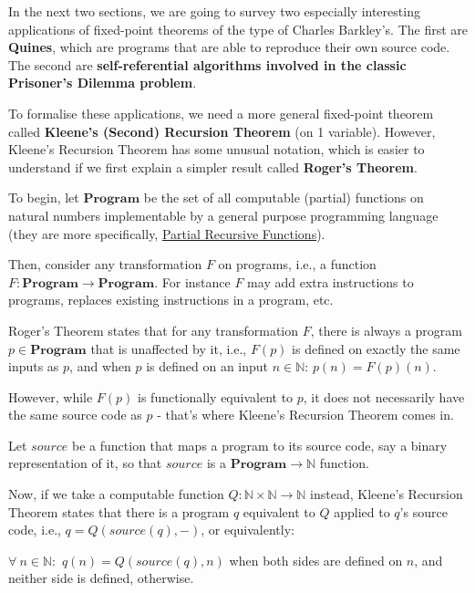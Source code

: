 In the next two sections, we are going to survey two especially interesting applications of fixed-point theorems of the type of Charles Barkley's. The first are \textbf{Quines}, which are programs that are able to reproduce their own source code. The second are \textbf{self-referential algorithms involved in the classic Prisoner's Dilemma problem}.

To formalise these applications, we need a more general fixed-point theorem called \textbf{Kleene's (Second) Recursion Theorem} (on 1 variable). However, Kleene's Recursion Theorem has some unusual notation, which is easier to understand if we first explain a simpler result called \textbf{Roger's Theorem}.

To begin, let $\textbf{Program}$ be the set of all computable (partial) functions on natural numbers implementable by a general purpose programming language (they are more specifically, \href{https://en.wikipedia.org/wiki/General_recursive_function}{Partial Recursive Functions}).

Then, consider any transformation $F$ on programs, i.e., a function $F: \textbf{Program} \rightarrow \textbf{Program}$. For instance $F$ may add extra instructions to programs, replaces existing instructions in a program, etc.

Roger's Theorem states that for any transformation $F$, there is always a program $p \in \textbf{Program}$ that is unaffected by it, i.e., $F(p)$ is defined on exactly the same inputs as $p$, and when $p$ is defined on an input $n \in \mathbb{N}$: $p(n) = F(p)(n)$.

However, while $F(p)$ is functionally equivalent to $p$, it does not necessarily have the same source code as $p$ - that's where Kleene's Recursion Theorem comes in.

Let $source$ be a function that maps a program to its source code, say a binary representation of it, so that $source$ is a $\textbf{Program} \rightarrow \mathbb{N}$ function.

Now, if we take a computable function $Q: \mathbb{N} \times \mathbb{N} \rightarrow \mathbb{N}$ instead, Kleene's Recursion Theorem states that there is a program $q$ equivalent to $Q$ applied to $q$'s source code, i.e., $q = Q(source(q), -)$, or equivalently:
\begin{center*}
    $\forall\ n \in \mathbb{N}:$ $q(n) = Q(source(q), n)$ when both sides are defined on $n$, and neither side is defined, otherwise.
\end{center*}




